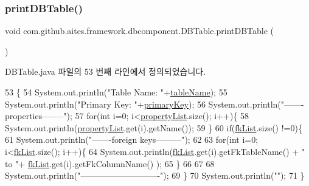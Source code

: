 \subsubsection{\texorpdfstring{print\+D\+B\+Table()}{printDBTable()}}
{\footnotesize\ttfamily void com.\+github.\+aites.\+framework.\+dbcomponent.\+D\+B\+Table.\+print\+D\+B\+Table (\begin{DoxyParamCaption}{ }\end{DoxyParamCaption})}



D\+B\+Table.\+java 파일의 53 번째 라인에서 정의되었습니다.


\begin{DoxyCode}
53                               \{
54         System.out.println(\textcolor{stringliteral}{"Table Name: "}+\mbox{\hyperlink{classcom_1_1github_1_1aites_1_1framework_1_1dbcomponent_1_1_d_b_table_a13baee6ab61eeea3b604d2a7b99b11e7}{tableName}});
55         System.out.println(\textcolor{stringliteral}{"Primary Key: "}+\mbox{\hyperlink{classcom_1_1github_1_1aites_1_1framework_1_1dbcomponent_1_1_d_b_table_a2a972d26ced2f37c2e83625617951e2a}{primaryKey}});
56         System.out.println(\textcolor{stringliteral}{"-------properties--------"});
57         \textcolor{keywordflow}{for}(\textcolor{keywordtype}{int} i=0; i<\mbox{\hyperlink{classcom_1_1github_1_1aites_1_1framework_1_1dbcomponent_1_1_d_b_table_aaa1e58925c9f05a3cdc868defed1e0de}{propertyList}}.size(); i++)\{
58             System.out.println(\mbox{\hyperlink{classcom_1_1github_1_1aites_1_1framework_1_1dbcomponent_1_1_d_b_table_aaa1e58925c9f05a3cdc868defed1e0de}{propertyList}}.get(i).getName());
59         \}
60         \textcolor{keywordflow}{if}(\mbox{\hyperlink{classcom_1_1github_1_1aites_1_1framework_1_1dbcomponent_1_1_d_b_table_ae3a224a5b6fc20939a74e36127103bcc}{fkList}}.size() !=0)\{
61             System.out.println(\textcolor{stringliteral}{"-------foreign keys---------"});
62         
63             \textcolor{keywordflow}{for}(\textcolor{keywordtype}{int} i=0; i<\mbox{\hyperlink{classcom_1_1github_1_1aites_1_1framework_1_1dbcomponent_1_1_d_b_table_ae3a224a5b6fc20939a74e36127103bcc}{fkList}}.size(); i++)\{
64                 System.out.println(\mbox{\hyperlink{classcom_1_1github_1_1aites_1_1framework_1_1dbcomponent_1_1_d_b_table_ae3a224a5b6fc20939a74e36127103bcc}{fkList}}.get(i).getFkTableName() + \textcolor{stringliteral}{" to "}+ 
      \mbox{\hyperlink{classcom_1_1github_1_1aites_1_1framework_1_1dbcomponent_1_1_d_b_table_ae3a224a5b6fc20939a74e36127103bcc}{fkList}}.get(i).getFkColumnName() );
65             \}
66         
67         
68             System.out.println(\textcolor{stringliteral}{"----------------------------"});
69         \}
70         System.out.println(\textcolor{stringliteral}{""});
71     \}
\end{DoxyCode}
